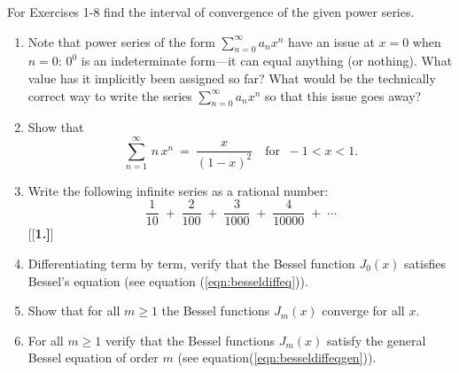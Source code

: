 {\small
{}
\par\noindent For Exercises 1-8 find the interval of convergence of the given
power series.
\begin{enumerate}[\bfseries 1.]
 \item Note that power series of the form $\sum_{n=0}^{\infty} a_n x^n$ have an
  issue at $x=0$ when $n=0$: $0^0$ is an indeterminate form---it can equal
  anything (or nothing). What value has it implicitly been assigned so far?
  What would be the technically correct way to write the series
  $\sum_{n=0}^{\infty} a_n x^n$ so that this issue goes away?
 \item Show that
\[
\sum_{n=1}^{\infty}\,n\,x^n ~=~ \frac{x}{(1-x)^2} \quad\text{for $~-1<x<1$.}
\]
 \item Write the following infinite series as a rational number:
\[
\frac{1}{10} \;+\; \frac{2}{100} \;+\; \frac{3}{1000} \;+\; \frac{4}{10000}
\;+\; \cdots
\]
[{[\bfseries 1.]}]
 \item Differentiating term by term, verify that the Bessel function $J_0(x)$
  satisfies Bessel's equation (see equation (\ref{eqn:besseldiffeq})).
 \item Show that for all $m \ge 1$ the Bessel functions $J_m(x)$ converge for
  all $x$.
 \item For all $m \ge 1$ verify that the Bessel functions $J_m(x)$ satisfy the
  general Bessel equation of order $m$
  (see equation(\ref{eqn:besseldiffeqgen})).

\end{enumerate}}
